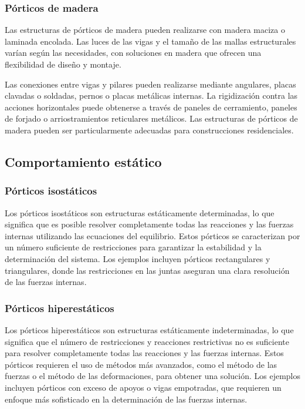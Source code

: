 \documentclass[14pt,letterpaper]{extarticle}
\begin{document}
	\subsubsection{Pórticos de madera}
	
	Las estructuras de pórticos de madera pueden realizarse con madera maciza o laminada encolada. Las luces de las vigas y el tamaño de las mallas estructurales varían según las necesidades, con soluciones en madera que ofrecen una flexibilidad de diseño y montaje.
	
	Las conexiones entre vigas y pilares pueden realizarse mediante angulares, placas clavadas o soldadas, pernos o placas metálicas internas. La rigidización contra las acciones horizontales puede obtenerse a través de paneles de cerramiento, paneles de forjado o arriostramientos reticulares metálicos. Las estructuras de pórticos de madera pueden ser particularmente adecuadas para construcciones residenciales.
	
	\subsection{Comportamiento estático}
	
	\subsubsection{Pórticos isostáticos}
	
	Los pórticos isostáticos son estructuras estáticamente determinadas, lo que significa que es posible resolver completamente todas las reacciones y las fuerzas internas utilizando las ecuaciones del equilibrio. Estos pórticos se caracterizan por un número suficiente de restricciones para garantizar la estabilidad y la determinación del sistema. Los ejemplos incluyen pórticos rectangulares y triangulares, donde las restricciones en las juntas aseguran una clara resolución de las fuerzas internas.
	
	\subsubsection{Pórticos hiperestáticos}
	
	Los pórticos hiperestáticos son estructuras estáticamente indeterminadas, lo que significa que el número de restricciones y reacciones restrictivas no es suficiente para resolver completamente todas las reacciones y las fuerzas internas. Estos pórticos requieren el uso de métodos más avanzados, como el método de las fuerzas o el método de las deformaciones, para obtener una solución. Los ejemplos incluyen pórticos con exceso de apoyos o vigas empotradas, que requieren un enfoque más sofisticado en la determinación de las fuerzas internas.
	
\end{document}
